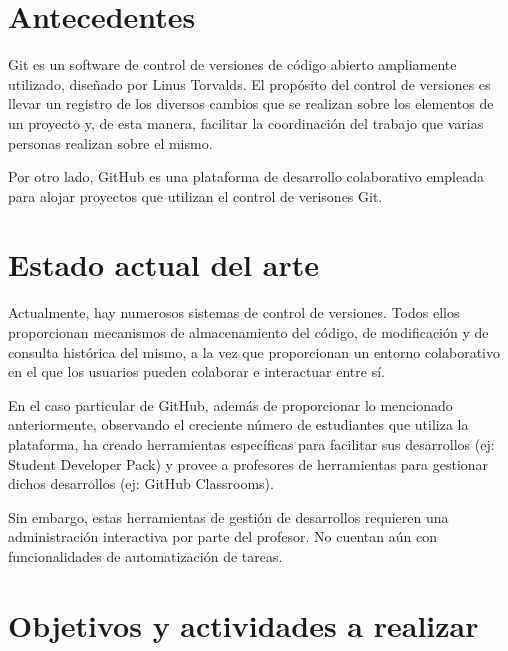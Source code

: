 
\section{Antecedentes}
\label{1:sec:1}

Git es un software de control de versiones de código abierto ampliamente utilizado, diseñado por Linus Torvalds.
El propósito del control de versiones es llevar un registro de los diversos cambios que se realizan sobre
los elementos de un proyecto y, de esta manera, facilitar la coordinación del trabajo que varias personas
realizan sobre el mismo.
\bigskip

Por otro lado, GitHub es una plataforma de desarrollo colaborativo empleada para alojar proyectos que utilizan el control de verisones Git.

\section{Estado actual del arte}
\label{1:sec:2}

Actualmente, hay numerosos sistemas de control de versiones. Todos ellos proporcionan mecanismos de almacenamiento del código, de modificación y de consulta histórica del mismo, a la vez que proporcionan un entorno colaborativo en el que los usuarios pueden colaborar e interactuar entre sí.

En el caso particular de GitHub, además de proporcionar lo mencionado anteriormente, observando el creciente número de estudiantes que utiliza la plataforma, ha creado herramientas específicas para facilitar sus desarrollos (ej: Student Developer Pack) y provee a profesores de herramientas para gestionar dichos desarrollos (ej: GitHub Classrooms).

Sin embargo, estas herramientas de gestión de desarrollos requieren una administración interactiva por parte del profesor. No cuentan aún con funcionalidades de automatización de tareas.

\section{Objetivos y actividades a realizar}
\label{1:sec:3}

